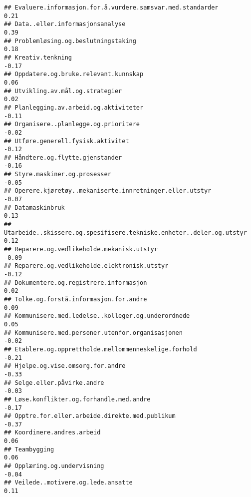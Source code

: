 \documentclass[
]{article}
\begin{document}
\begin{verbatim}
## Evaluere.informasjon.for.å.vurdere.samsvar.med.standarder                         0.21
## Data..eller.informasjonsanalyse                                                   0.39
## Problemløsing.og.beslutningstaking                                                0.18
## Kreativ.tenkning                                                                 -0.17
## Oppdatere.og.bruke.relevant.kunnskap                                              0.06
## Utvikling.av.mål.og.strategier                                                    0.02
## Planlegging.av.arbeid.og.aktiviteter                                             -0.11
## Organisere..planlegge.og.prioritere                                              -0.02
## Utføre.generell.fysisk.aktivitet                                                 -0.12
## Håndtere.og.flytte.gjenstander                                                   -0.16
## Styre.maskiner.og.prosesser                                                      -0.05
## Operere.kjøretøy..mekaniserte.innretninger.eller.utstyr                          -0.07
## Datamaskinbruk                                                                    0.13
## Utarbeide..skissere.og.spesifisere.tekniske.enheter..deler.og.utstyr              0.12
## Reparere.og.vedlikeholde.mekanisk.utstyr                                         -0.09
## Reparere.og.vedlikeholde.elektronisk.utstyr                                      -0.12
## Dokumentere.og.registrere.informasjon                                             0.02
## Tolke.og.forstå.informasjon.for.andre                                             0.09
## Kommunisere.med.ledelse..kolleger.og.underordnede                                 0.05
## Kommunisere.med.personer.utenfor.organisasjonen                                  -0.02
## Etablere.og.opprettholde.mellommenneskelige.forhold                              -0.21
## Hjelpe.og.vise.omsorg.for.andre                                                  -0.33
## Selge.eller.påvirke.andre                                                        -0.03
## Løse.konflikter.og.forhandle.med.andre                                           -0.17
## Opptre.for.eller.arbeide.direkte.med.publikum                                    -0.37
## Koordinere.andres.arbeid                                                          0.06
## Teambygging                                                                       0.06
## Opplæring.og.undervisning                                                        -0.04
## Veilede..motivere.og.lede.ansatte                                                 0.11

\end{verbatim}
\end{document}
